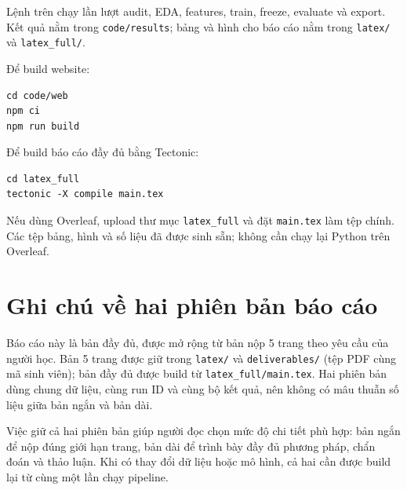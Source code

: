 Lệnh trên chạy lần lượt audit, EDA, features, train, freeze, evaluate và export.
Kết quả nằm trong \texttt{code/results}; bảng và hình cho báo cáo nằm trong
\texttt{latex/} và \texttt{latex\_full/}.

Để build website:

\begin{verbatim}
cd code/web
npm ci
npm run build
\end{verbatim}

Để build báo cáo đầy đủ bằng Tectonic:

\begin{verbatim}
cd latex_full
tectonic -X compile main.tex
\end{verbatim}

Nếu dùng Overleaf, upload thư mục \texttt{latex\_full} và đặt \texttt{main.tex}
làm tệp chính. Các tệp bảng, hình và số liệu đã được sinh sẵn; không cần chạy lại
Python trên Overleaf.

\section{Ghi chú về hai phiên bản báo cáo}
\label{app:versions}

Báo cáo này là bản đầy đủ, được mở rộng từ bản nộp 5 trang theo yêu cầu của người
học. Bản 5 trang được giữ trong \texttt{latex/} và
\texttt{deliverables/} (tệp PDF cùng mã sinh viên); bản đầy đủ được build
từ \texttt{latex\_full/main.tex}. Hai phiên bản dùng chung dữ liệu, cùng run ID và
cùng bộ kết quả, nên không có mâu thuẫn số liệu giữa bản ngắn và bản dài.

Việc giữ cả hai phiên bản giúp người đọc chọn mức độ chi tiết phù hợp: bản ngắn để
nộp đúng giới hạn trang, bản dài để trình bày đầy đủ phương pháp, chẩn đoán và
thảo luận. Khi có thay đổi dữ liệu hoặc mô hình, cả hai cần được build lại từ cùng
một lần chạy pipeline.

